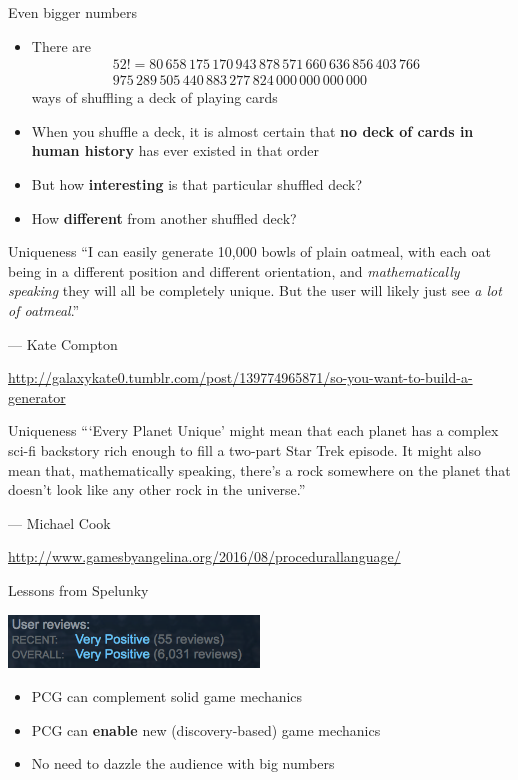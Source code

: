 \begin{frame}{Even bigger numbers}
	\begin{itemize}
		\pause\item There are
			\begin{align*}
		 		52! = 80\,658\,175\,170\,943\,878\,571\,660\,636\,856\,403\,766 &\\
		 		          975\,289\,505\,440\,883\,277\,824\,000\,000\,000\,000 &
		 	\end{align*}
			ways of shuffling a deck of playing cards
		\pause\item When you shuffle a deck, it is almost certain that
			\textbf{no deck of cards in human history} has ever existed in that order
		\pause\item But how \textbf{interesting} is that particular shuffled deck?
		\pause\item How \textbf{different} from another shuffled deck?
	\end{itemize}
\end{frame}

\begin{frame}{Uniqueness}
	``I can easily generate 10,000 bowls of plain oatmeal, with each oat being in a different position 
	and different orientation, and \textit{mathematically speaking} they will all be completely unique.
	But the user will likely just see \textit{a lot of oatmeal}.''
	
	--- Kate Compton
	
	{\tiny\url{http://galaxykate0.tumblr.com/post/139774965871/so-you-want-to-build-a-generator}}
\end{frame}

\begin{frame}{Uniqueness}
	``\thinspace`Every Planet Unique' might mean that each planet has a complex sci-fi backstory rich enough to 
	fill a two-part Star Trek episode.
	It might also mean that, mathematically speaking, there's a rock somewhere on the planet that
	doesn't look like any other rock in the universe.''
	
	--- Michael Cook

	{\tiny\url{http://www.gamesbyangelina.org/2016/08/procedurallanguage/}}
\end{frame}

\begin{frame}{Lessons from Spelunky}
	\begin{center}
		\pause\includegraphics[width=0.5\textwidth]{spelunky_steamreviews}
	\end{center}
	\begin{itemize}
		\pause\item PCG can complement solid game mechanics
		\pause\item PCG can \textbf{enable} new (discovery-based) game mechanics
		\pause\item No need to dazzle the audience with big numbers
	\end{itemize}	
\end{frame}


